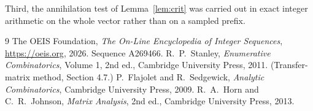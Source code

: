 \documentclass[11pt,a4paper]{article}
\theoremstyle{plain}
\theoremstyle{definition}
\begin{document}
Third, the annihilation test of Lemma~\ref{lem:crit} was carried out in exact integer
arithmetic on the whole vector rather than on a sampled prefix.

\begin{thebibliography}{9}
 The OEIS Foundation, \emph{The On-Line Encyclopedia of Integer
Sequences}, \url{https://oeis.org}, 2026. Sequence A269466.
 R.~P.~Stanley, \emph{Enumerative Combinatorics}, Volume 1, 2nd ed.,
Cambridge University Press, 2011. (Transfer-matrix method, Section 4.7.)
 P.~Flajolet and R.~Sedgewick, \emph{Analytic Combinatorics}, Cambridge
University Press, 2009.
 R.~A.~Horn and C.~R.~Johnson, \emph{Matrix Analysis}, 2nd ed., Cambridge
University Press, 2013.
\end{thebibliography}
\end{document}
